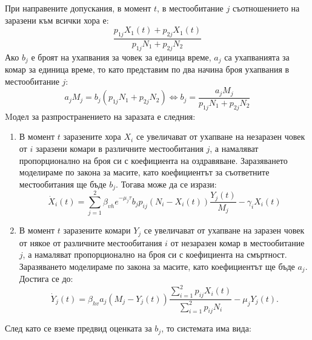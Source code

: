 При направените допускания, в момент $t$, в местообитание $j$ съотношението на заразени към всички хора е:
\begin{equation}
  \frac{p_{1j} X_1(t) + p_{2j} X_1(t)}{p_{1j} N_1 + p_{2j} N_2}
\end{equation}
Ако $b_j$ е броят на ухапвания за човек за единица време, $a_j$ са ухапванията за комар за единица време, то като представим по два начина броя ухапвания в местообитание $j$:
\begin{equation}
  a_j M_j = b_j (p_{1j} N_1 + p_{2j} N_2) \iff b_j = \frac{a_j M_j}{p_{1j} N_1 + p_{2j} N_2}
\end{equation}
Mодел за разпространението на заразата е следния:
\begin{enumerate}
  \item В момент $t$ заразените хора $X_i$ се увеличават от ухапване на незаразен човек от $i$ заразени комари в различните местообитания $j$, а намаляват пропорционално на броя си с коефициента на оздравяване. Заразяването моделираме по закона за масите, като коефициентът за съответните местообитания ще бъде $b_j$. Тогава може да се изрази:
  \begin{equation}
    \dot{X}_i(t) = \sum_{j=1}^{2} \beta_{vh} e^{-\mu_j \tau} b_j p_{ij} (N_i - X_i(t)) \frac{Y_j(t)}{M_j} - \gamma_i X_i(t)
  \end{equation}
  \item В момент $t$ заразените комари $Y_j$ се увеличават от ухапване на заразен човек от някое от различните местообитания $i$ от незаразен комар в местообитание $j$, а намаляват пропорционално на броя си с коефициента на смъртност. Заразяването моделираме по закона за масите, като коефициентът ще бъде $a_j$. Достига се до:
  \begin{equation}
    \dot{Y}_j(t) = \beta_{hv} a_j (M_j - Y_j(t)) \frac{\sum_{i=1}^2 p_{ij} X_i(t)}{\sum_{i=1}^2 p_{ij} N_i} - \mu_j Y_j(t).
  \end{equation}
\end{enumerate}
След като се вземе предвид оценката за $b_j$, то системата има вида:
